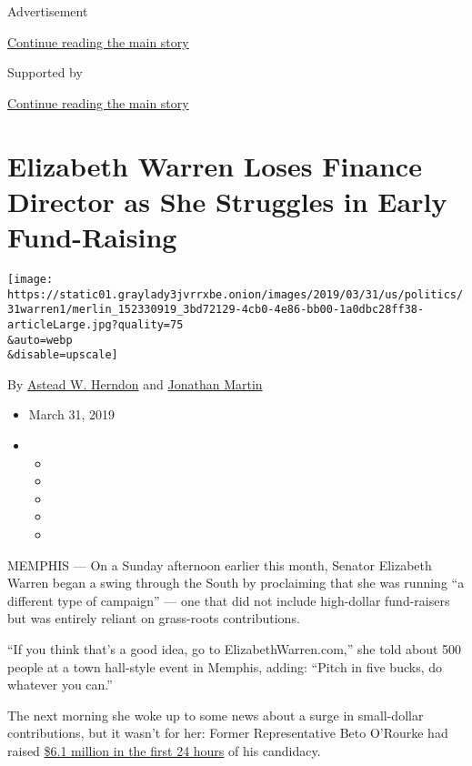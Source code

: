 Advertisement

\protect\hyperlink{after-top}{Continue reading the main story}

Supported by

\protect\hyperlink{after-sponsor}{Continue reading the main story}

\hypertarget{elizabeth-warren-loses-finance-director-as-she-struggles-in-early-fund-raising}{%
\section{Elizabeth Warren Loses Finance Director as She Struggles in
Early
Fund-Raising}\label{elizabeth-warren-loses-finance-director-as-she-struggles-in-early-fund-raising}}

\texttt{[image: https://static01.graylady3jvrrxbe.onion/images/2019/03/31/us/politics/31warren1/merlin\_152330919\_3bd72129-4cb0-4e86-bb00-1a0dbc28ff38-articleLarge.jpg?quality=75\\\&auto=webp\\\&disable=upscale]}

By \href{https://www.nytimes3xbfgragh.onion/by/astead-w-herndon}{Astead
W. Herndon} and
\href{https://www.nytimes3xbfgragh.onion/by/jonathan-martin}{Jonathan
Martin}

\begin{itemize}
\item
  March 31, 2019
\item
  \begin{itemize}
  \item
  \item
  \item
  \item
  \item
  \end{itemize}
\end{itemize}

MEMPHIS --- On a Sunday afternoon earlier this month, Senator Elizabeth
Warren began a swing through the South by proclaiming that she was
running ``a different type of campaign'' --- one that did not include
high-dollar fund-raisers but was entirely reliant on grass-roots
contributions.

``If you think that's a good idea, go to ElizabethWarren.com,'' she told
about 500 people at a town hall-style event in Memphis, adding: ``Pitch
in five bucks, do whatever you can.''

The next morning she woke up to some news about a surge in small-dollar
contributions, but it wasn't for her: Former Representative Beto
O'Rourke had raised
\href{https://www.nytimes3xbfgragh.onion/2019/03/18/us/politics/beto-o-rourke-fundraising.html}{\$6.1
million in the first 24 hours} of his candidacy.

